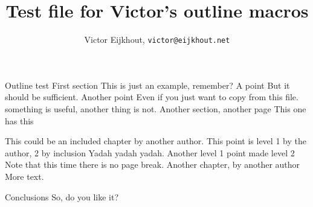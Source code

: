 \documentclass{article}
\begin{document}
\title{Test file for Victor's outline macros}
\author{Victor Eijkhout, {\tt victor@eijkhout.net}}
\maketitle

\begin{Outline}
 {Outline test}
 {First section}
This is just an example, remember?
 {A point}
But it should be sufficient.
 {Another point}
Even if you just want to copy from this file.
 {something} is useful,  {another thing} is not.
 {Another section, another page}
 {This one has this} 

 {This could be an included chapter}
by another author.
 {This point is level 1 by the author, 2 by inclusion}
Yadah yadah yadah.
 {Another level 1 point made level 2}
Note that this time there is no page break.
 {Another chapter, by another author}
More text.

 {Conclusions}
So, do you like it?
\end{Outline}
\end{document}
